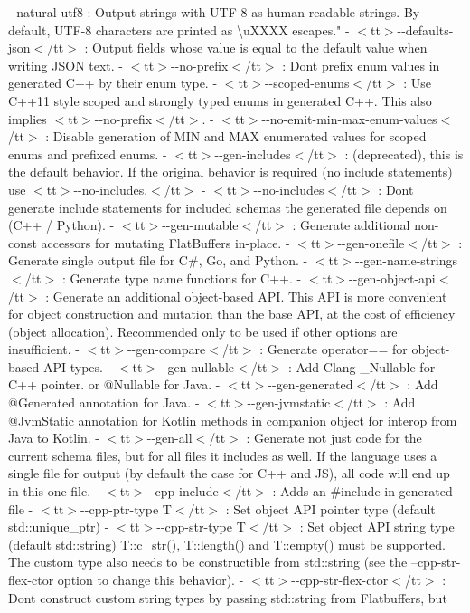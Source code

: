 \begin{DoxyItemize}
\item {\ttfamily -\/-\/natural-\/utf8} \+: Output strings with UTF-\/8 as human-\/readable strings. By default, UTF-\/8 characters are printed as \textbackslash{}u\+XXXX escapes."{}  -\/   $<$tt$>$-\/-\/defaults-\/json$<$/tt$>$ \+: Output fields whose value is equal to the default value     when writing JSON text.  -\/   $<$tt$>$-\/-\/no-\/prefix$<$/tt$>$ \+: Don\textquotesingle{}t prefix enum values in generated C++ by their enum     type.  -\/   $<$tt$>$-\/-\/scoped-\/enums$<$/tt$>$ \+: Use C++11 style scoped and strongly typed enums in     generated C++. This also implies $<$tt$>$-\/-\/no-\/prefix$<$/tt$>$.  -\/   $<$tt$>$-\/-\/no-\/emit-\/min-\/max-\/enum-\/values$<$/tt$>$ \+: Disable generation of MIN and MAX     enumerated values for scoped enums and prefixed enums.  -\/   $<$tt$>$-\/-\/gen-\/includes$<$/tt$>$ \+: (deprecated), this is the default behavior.                        If the original behavior is required (no include                        statements) use $<$tt$>$-\/-\/no-\/includes.$<$/tt$>$  -\/   $<$tt$>$-\/-\/no-\/includes$<$/tt$>$ \+: Don\textquotesingle{}t generate include statements for included schemas the     generated file depends on (\+C++ / Python).  -\/   $<$tt$>$-\/-\/gen-\/mutable$<$/tt$>$ \+: Generate additional non-\/const accessors for mutating     Flat\+Buffers in-\/place.  -\/   $<$tt$>$-\/-\/gen-\/onefile$<$/tt$>$ \+: Generate single output file for C\#, Go, and Python.  -\/   $<$tt$>$-\/-\/gen-\/name-\/strings$<$/tt$>$ \+: Generate type name functions for C++.  -\/   $<$tt$>$-\/-\/gen-\/object-\/api$<$/tt$>$ \+: Generate an additional object-\/based API. This API is     more convenient for object construction and mutation than the base API,     at the cost of efficiency (object allocation). Recommended only to be used     if other options are insufficient.  -\/   $<$tt$>$-\/-\/gen-\/compare$<$/tt$>$  \+:  Generate operator== for object-\/based API types.  -\/   $<$tt$>$-\/-\/gen-\/nullable$<$/tt$>$ \+: Add Clang \+\_\+\+Nullable for C++ pointer. or @\+Nullable for Java.  -\/   $<$tt$>$-\/-\/gen-\/generated$<$/tt$>$ \+: Add @\+Generated annotation for Java.  -\/   $<$tt$>$-\/-\/gen-\/jvmstatic$<$/tt$>$ \+: Add @\+Jvm\+Static annotation for Kotlin methods     in companion object for interop from Java to Kotlin.  -\/   $<$tt$>$-\/-\/gen-\/all$<$/tt$>$ \+: Generate not just code for the current schema files, but     for all files it includes as well. If the language uses a single file for     output (by default the case for C++ and JS), all code will end up in     this one file.  -\/   $<$tt$>$-\/-\/cpp-\/include$<$/tt$>$ \+: Adds an \#include in generated file  -\/   $<$tt$>$-\/-\/cpp-\/ptr-\/type T$<$/tt$>$ \+: Set object API pointer type (default std\+::unique\+\_\+ptr)  -\/   $<$tt$>$-\/-\/cpp-\/str-\/type T$<$/tt$>$ \+: Set object API string type (default std\+::string)     T\+::c\+\_\+str(), T\+::length() and T\+::empty() must be supported.     The custom type also needs to be constructible from std\+::string (see the     --cpp-\/str-\/flex-\/ctor option to change this behavior).  -\/   $<$tt$>$-\/-\/cpp-\/str-\/flex-\/ctor$<$/tt$>$ \+: Don\textquotesingle{}t construct custom string types by passing     std\+::string from Flatbuffers, but 
\end{DoxyItemize}
